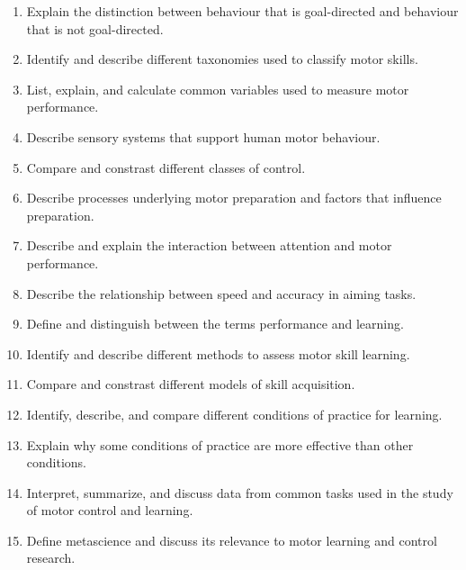 \documentclass[hidelinks,11pt]{article}
\begin{document}
\vspace{-0.5em}\begin{enumerate}\itemsep0em
  \item Explain the distinction between behaviour that is goal-directed and behaviour that is not goal-directed.
  \item Identify and describe different taxonomies used to classify motor skills.
  \item List, explain, and calculate common variables used to measure motor performance.
  \item Describe sensory systems that support human motor behaviour.
  \item Compare and constrast different classes of control.
  \item Describe processes underlying motor preparation and factors that influence preparation.
  \item Describe and explain the interaction between attention and motor performance.
  \item Describe the relationship between speed and accuracy in aiming tasks.
  \item Define and distinguish between the terms performance and learning.
  \item Identify and describe different methods to assess motor skill learning.
  \item Compare and constrast different models of skill acquisition.
  \item Identify, describe, and compare different conditions of practice for learning.
  \item Explain why some conditions of practice are more effective than other conditions.
  \item Interpret, summarize, and discuss data from common tasks used in the study of motor control and learning.
  \item Define metascience and discuss its relevance to motor learning and control research.
\end{enumerate}
\end{document}
